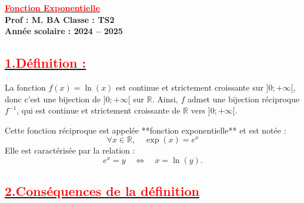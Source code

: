 \documentclass[12pt,a4paper]{article}
\begin{document}
\begin{center}
    \Large\textbf{\underline{\textcolor{red}{Fonction Exponentielle}}}\\[-0.1cm]
    \normalsize\textbf{Prof : M. BA} \hfill \textbf{Classe : TS2}\\[-0.1cm]
    \textbf{Année scolaire : 2024 -- 2025}
\end{center}

\subsection*{\underline{\textbf{\textcolor{red}{1.Définition :}}}}
La fonction \( f(x) = \ln(x) \) est continue et strictement croissante sur \( ]0; +\infty[ \), donc c'est une bijection de \( ]0; +\infty[ \) sur \( \mathbb{R} \). Ainsi, \( f \) admet une bijection réciproque \( f^{-1} \), qui est continue et strictement croissante de \( \mathbb{R} \) vers \( ]0; +\infty[ \). 

Cette fonction réciproque est appelée **fonction exponentielle** et est notée :
\[
\forall x \in \mathbb{R}, \quad \exp(x) = e^x
\]
Elle est caractérisée par la relation :
\[
e^x = y \quad \Leftrightarrow \quad x = \ln(y).
\]
\subsection*{\underline{\textbf{\textcolor{red}{2.Conséquences de la définition}}}}
\end{document}
